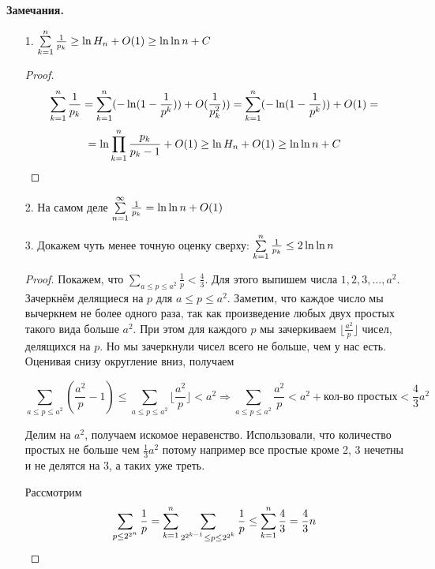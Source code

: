 \textbf{Замечания.} 
\begin{enumerate}
    \item [1.] $\sum \limits_{k=1}^n \frac{1}{p_k} \geq \ln H_n + O(1) \geq \ln \ln n + C$
    \begin{proof}
        \begin{equation*}
            \sum \limits_{k=1}^n \frac{1}{p_k} = \sum \limits_{k=1}^n (-\ln(1-\frac{1}{p^k})) + O(\frac{1}{p_k^2})) = \sum \limits_{k=1}^n (-\ln(1-\frac{1}{p^k})) + O(1) =
        \end{equation*}
        \begin{equation*}
            = \ln \prod \limits_{k=1}^n \frac{p_k}{p_k-1} + O(1) \geq \ln H_n + O(1) \geq \ln \ln n + C
        \end{equation*}
    \end{proof}
    \item[2.] На самом деле $\sum \limits_{n=1}^\infty \frac{1}{p_k} = \ln \ln n + O(1)$
    \item[3.] Докажем чуть менее точную оценку сверху: $\sum \limits_{k=1}^n \frac{1}{p_k} \leq 2\ln \ln n$
    \begin{proof}
        Покажем, что $\sum \limits_{a \leq p \leq a^2} \frac{1}{p} < \frac{4}{3}$. Для
        этого выпишем числа $1, 2, 3, \ldots, a^2$. Зачеркнём делящиеся на $p$ для $a \leq p \leq a^2$.
        Заметим, что каждое число мы вычеркнем не более одного раза, так как произведение любых двух простых
        такого вида больше $a^2$. При этом для каждого $p$ мы зачеркиваем $\lfloor \frac{a^2}{p} \rfloor$ чисел, делящихся на $p$.
        Но мы зачеркнули чисел всего не больше, чем у нас есть. Оценивая снизу округление вниз, получаем

        \begin{equation*}
            \sum_{a \leq p \leq a^2}(\frac{a^2}{p} - 1) \leq \sum_{a \leq p \leq a^2} \lfloor \frac{a^2}{p} \rfloor < a^2
            \Rightarrow \sum_{a \leq p \leq a^2} \frac{a^2}{p} < a^2 + \text{кол-во простых} < \frac{4}{3}a^2 \
        \end{equation*}

        Делим на $a^2$, получаем искомое неравенство. Использовали, что количество простых не больше чем $\frac{1}{3}a^2$ потому например
        все простые кроме 2, 3 нечетны и не делятся на $3$, а таких уже треть.

        Рассмотрим
        \begin{equation*}
            \sum_{p \leq 2^{2^n}} \frac{1}{p} = \sum \limits_{k=1}^n \sum_{2^{2^{k-1}} \leq p \leq 2^{2^k}} \frac{1}{p}
            \leq \sum \limits_{k=1}^n \frac{4}{3} = \frac{4}{3}n
        \end{equation*}


\end{proof}
\end{enumerate}
